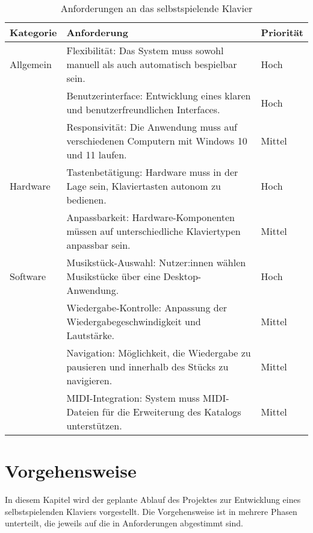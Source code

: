 \begin{table}[ht]
    \centering
    \begin{tabular}{ | m{2cm} | m{10cm}| m{2cm} | }
        \hline
        \textbf{Kategorie} & \textbf{Anforderung} & \textbf{Priorität} \\
        \hline %
        Allgemein & Flexibilität: Das System muss sowohl manuell als auch automatisch bespielbar sein. & Hoch \\
        \cline{2-3}
        & Benutzerinterface: Entwicklung eines klaren und benutzerfreundlichen Interfaces. & Hoch \\
        \cline{2-3}
        & Responsivität: Die Anwendung muss auf verschiedenen Computern mit Windows 10 und 11 laufen. & Mittel \\
        \cline{2-3}
        \hline
        Hardware & Tastenbetätigung: Hardware muss in der Lage sein, Klaviertasten autonom zu bedienen. & Hoch \\
        \cline{2-3}
        & Anpassbarkeit: Hardware-Komponenten müssen auf unterschiedliche Klaviertypen anpassbar sein. & Mittel \\
        \hline
        Software & Musikstück-Auswahl: Nutzer:innen wählen Musikstücke über eine Desktop-Anwendung. & Hoch \\
        \cline{2-3}
        & Wiedergabe-Kontrolle: Anpassung der Wiedergabegeschwindigkeit und Lautstärke. & Mittel \\
        \cline{2-3}
        & Navigation: Möglichkeit, die Wiedergabe zu pausieren und innerhalb des Stücks zu navigieren. & Mittel \\
        \cline{2-3}
        & MIDI-Integration: System muss MIDI-Dateien für die Erweiterung des Katalogs unterstützen. & Mittel \\
        \hline
    \end{tabular}
    \caption{Anforderungen an das selbstspielende Klavier}
    \label{table:anforderungen}
\end{table}


\section{Vorgehensweise} \label{sec:zielstellung-vorgehen}

In diesem Kapitel wird der geplante Ablauf des Projektes zur Entwicklung eines selbstspielenden Klaviers vorgestellt.
Die Vorgehensweise ist in mehrere Phasen unterteilt, die jeweils auf die in Anforderungen abgestimmt sind.

